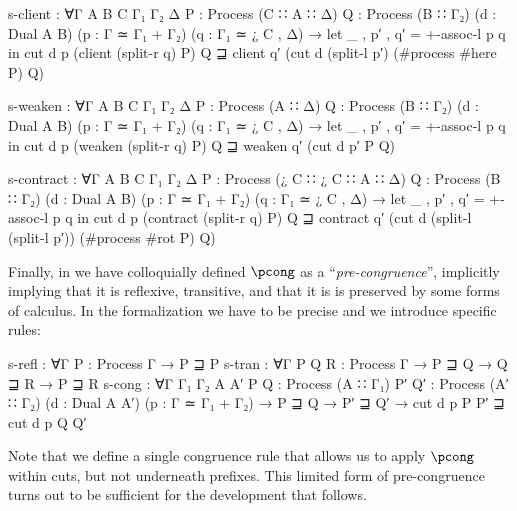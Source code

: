 \begin{AgdaAlign}
\begin{code}[hide]
  s-client :
    ∀{Γ A B C Γ₁ Γ₂ Δ}
    {P : Process (C ∷ A ∷ Δ)}
    {Q : Process (B ∷ Γ₂)}
    (d : Dual A B) (p : Γ ≃ Γ₁ + Γ₂) (q : Γ₁ ≃ ¿ C , Δ) →
    let _ , p′ , q′ = +-assoc-l p q in
    cut d p (client (split-r q) P) Q ⊒
    client q′ (cut d (split-l p′) (#process #here P) Q)

  s-weaken :
    ∀{Γ A B C Γ₁ Γ₂ Δ}
    {P : Process (A ∷ Δ)}
    {Q : Process (B ∷ Γ₂)}
    (d : Dual A B) (p : Γ ≃ Γ₁ + Γ₂) (q : Γ₁ ≃ ¿ C , Δ) →
    let _ , p′ , q′ = +-assoc-l p q in
    cut d p (weaken (split-r q) P) Q ⊒
    weaken q′ (cut d p′ P Q)

  s-contract :
    ∀{Γ A B C Γ₁ Γ₂ Δ}
    {P : Process (¿ C ∷ ¿ C ∷ A ∷ Δ)}
    {Q : Process (B ∷ Γ₂)}
    (d : Dual A B) (p : Γ ≃ Γ₁ + Γ₂) (q : Γ₁ ≃ ¿ C , Δ) →
    let _ , p′ , q′ = +-assoc-l p q in
    cut d p (contract (split-r q) P) Q ⊒
    contract q′ (cut d (split-l (split-l p′)) (#process #rot P) Q)
\end{code}

Finally, in  we have colloquially defined $\pcong$ as a
``\emph{pre-congruence}'', implicitly implying that it is reflexive, transitive,
and that it is is preserved by some forms of calculus. In the formalization we
have to be precise and we introduce specific rules:

\begin{code}
  s-refl  : ∀{Γ} {P : Process Γ} → P ⊒ P
  s-tran  : ∀{Γ} {P Q R : Process Γ} → P ⊒ Q → Q ⊒ R → P ⊒ R
  s-cong  : ∀{Γ Γ₁ Γ₂ A A′} {P Q : Process (A ∷ Γ₁)} {P′ Q′ : Process (A′ ∷ Γ₂)}
            (d : Dual A A′) (p : Γ ≃ Γ₁ + Γ₂) → P ⊒ Q → P′ ⊒ Q′ →
            cut d p P P′ ⊒ cut d p Q Q′
\end{code}

Note that we define a single congruence rule 
that allows us to apply $\pcong$ within cuts, but not underneath prefixes. This
limited form of pre-congruence turns out to be sufficient for the development
that follows.
\end{AgdaAlign}
